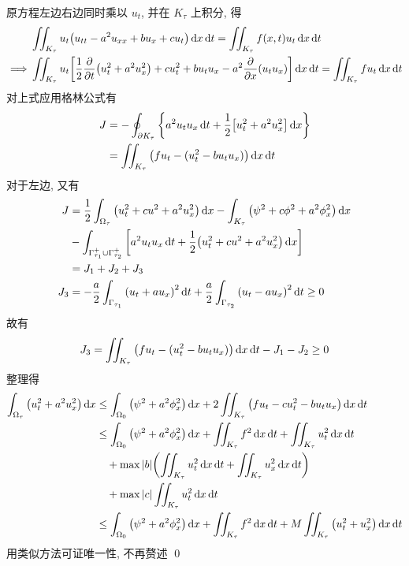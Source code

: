 \begin{solution}
原方程左边右边同时乘以 $u_t$, 并在 $K_\tau$ 上积分, 得
\[ \begin{aligned}
& \iint_{K_\tau} u_t \mclosure{
    u_{tt} - a^2 u_{xx} + b u_x + c u_t
} \diff x \diff t = \iint_{K_\tau} f(x, t) u_t \diff x \diff t \\
\implies & \iint_{K_\tau} u_t \mclosuresquare{
    \frac12 \fracpartials{t} \mclosure{u_t^2 + a^2 u_x^2}
    + c u_t^2 + b u_t u_x - a^2 \fracpartials{x} \mclosure{u_t u_x}
} \diff x \diff t = \iint_{K_\tau} f u_t \diff x \diff t
\end{aligned} \]
对上式应用格林公式有
\[ \begin{aligned}
J &= -\oint_{\partial K_\tau} {\left\{ {
    a^2 u_t u_x \operatorname{d\!} t + \frac12 {\left[ { u_t^2 + a^2 u_x^2 } \right]} \operatorname{d\!} x
} \right\}} \\
&= \iint_{K_\tau} {\left( { f u_t - (u_t^2 - b u_t u_x) } \right)} \operatorname{d\!} x \operatorname{d\!} t
\end{aligned} \]
对于左边, 又有
\[ \begin{aligned}
J &= \frac12 \int_{\Omega_\tau} {\left( {u_t^2 + cu^2 + a^2 u_x^2} \right)} \operatorname{d\!} x
- \int_{K_\tau} {\left( {\psi^2 + c\phi^2 + a^2 \phi_x^2} \right)} \operatorname{d\!} x \\
&- \int_{\Gamma_{\tau_1}^{+}\cup\Gamma_{\tau_2}^{+}} {\left[ {
    a^2 u_t u_x \operatorname{d\!} t + \frac12 {\left( {
        u_t^2 + c u^2 + a^2 u_x^2
    } \right)} \operatorname{d\!} x
} \right]} \\
&= J_1 + J_2 + J_3 \\
J_3 &= -\frac{a}{2} \int_{\Gamma_{\tau_1}} {\left( {
    u_t + a u_x
} \right)}^2 \operatorname{d\!} t + \frac{a}{2} \int_{\Gamma_{\tau_2}} {\left( {
    u_t - a u_x
} \right)}^2 \operatorname{d\!} t \geq 0
\end{aligned} \]
故有
\[
J_3 = \iint_{K_\tau} {\left( {
    f u_t - (u_t^2 - b u_t u_x)
} \right)} \operatorname{d\!} x \operatorname{d\!} t - J_1 - J_2 \geq 0
\]
整理得
\[ \begin{aligned}
\int_{\Omega_\tau} \mclosure{ u_t^2 + a^2 u_x^2 } \diff x
& \leq \int_{\Omega_0} \mclosure{ \psi^2 + a^2 \phi_x^2 } \diff x
 +2 \iint_{K_\tau} \mclosure{
    f u_t - c u_t^2 - b u_t u_x
} \diff x \diff t \\
&\leq \int_{\Omega_0} \mclosure{ \psi^2 + a^2 \phi_x^2 } \diff x
 +\iint_{K_\tau} f^2\diff x\diff t +\iint_{K_\tau} u_t^2\diff x\diff t \\
&\quad+ \max\abs{b} \mclosure{
    \iint_{K_\tau} u_t^2 \diff x \diff t + \iint_{K_\tau} u_x^2 \diff x \diff t
} \\
&\quad+ \max\abs{c} \iint_{K_\tau} u_t^2 \diff x \diff t \\
&\leq \int_{\Omega_0} \mclosure{ \psi^2 + a^2 \phi_x^2 } \diff x
+\iint_{K_\tau} f^2\diff x\diff t + M \iint_{K_\tau} \mclosure{
    u_t^2 + u_x^2
} \diff x \diff t
\end{aligned} \]
用类似方法可证唯一性, 不再赘述
\qed
\end{solution}


